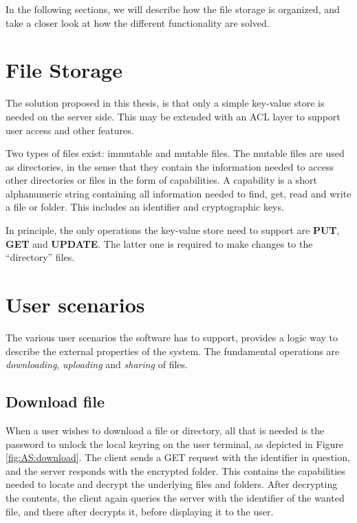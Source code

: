 \documentclass[english,12pt,a4paper]{book}
\begin{document}
In the following sections, we will describe how the file storage is organized,
and take a closer look at how the different functionality are solved.

\section{File Storage}
\label{sec:AS:FS}

The solution proposed in this thesis, is that only a simple key-value store is
needed on the server side. This may be extended with an \ac{ACL} layer to
support user access and other features.

Two types of files exist: immutable and mutable files. The mutable files are used
as directories, in the sense that they contain the information needed to access
other directories or files in the form of capabilities.
A capability is a short alphanumeric string containing all information needed
to find, get, read and write a file or folder. This includes an identifier and
cryptographic keys.

In principle, the only operations the key-value store need to support are
\textbf{PUT}, \textbf{GET} and \textbf{UPDATE}. The latter one is required to
make changes to the ``directory'' files.



\section{User scenarios}

The various user scenarios the software has to support, provides a logic way to
describe the external properties of the system. The fundamental operations are
\emph{downloading}, \emph{uploading} and \emph{sharing} of files.

\subsection{Download file}

When a user wishes to download a file or directory, all that is needed is the
password to unlock the local keyring on the user terminal, as depicted in Figure
\ref{fig:AS:download}. The client sends a GET request with the identifier in
question, and the server responds with the encrypted folder. This contains the
capabilities needed to locate and decrypt the underlying files and folders.
After decrypting the contents, the client again queries the server with the
identifier of the wanted file, and there after decrypts it, before displaying it
to the user.
\end{document}
